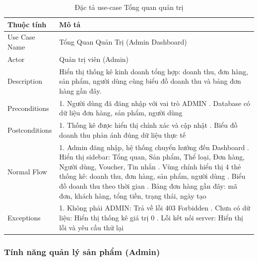 \begin{table}[H]
\centering
\begin{tabular}{|l|p{11cm}|}
\hline
\textbf{Thuộc tính} & \textbf{Mô tả} \\
\hline
Use Case Name & Tổng Quan Quản Trị (Admin Dashboard) \\
\hline
Actor & Quản trị viên (Admin) \\
\hline
Description & Hiển thị thống kê kinh doanh tổng hợp: doanh thu, đơn hàng, sản phẩm, người dùng cùng biểu đồ doanh thu và bảng đơn hàng gần đây. \\
\hline
Preconditions & 1. Người dùng đã đăng nhập với vai trò ADMIN \newline 2. Database có dữ liệu đơn hàng, sản phẩm, người dùng \\
\hline
Postconditions & 1. Thống kê được hiển thị chính xác và cập nhật \newline 2. Biểu đồ doanh thu phản ánh đúng dữ liệu thực tế \\
\hline
Normal Flow & 1. Admin đăng nhập, hệ thống chuyển hướng đến Dashboard \newline 2. Hiển thị sidebar: Tổng quan, Sản phẩm, Thể loại, Đơn hàng, Người dùng, Voucher, Tin nhắn \newline 3. Vùng chính hiển thị 4 thẻ thống kê: doanh thu, đơn hàng, sản phẩm, người dùng \newline 4. Biểu đồ doanh thu theo thời gian \newline 5. Bảng đơn hàng gần đây: mã đơn, khách hàng, tổng tiền, trạng thái, ngày tạo \\
\hline
Exceptions & 1. Không phải ADMIN: Trả về lỗi 403 Forbidden \newline 2. Chưa có dữ liệu: Hiển thị thống kê giá trị 0 \newline 3. Lỗi kết nối server: Hiển thị lỗi và yêu cầu thử lại \\
\hline
\end{tabular}
\caption{Đặc tả use-case Tổng quan quản trị}
\label{tab:uc011}
\end{table}

\subsubsection{Tính năng quản lý sản phẩm (Admin)}


